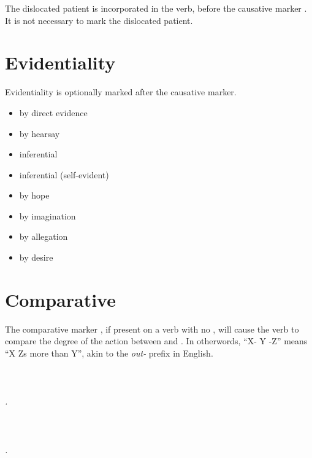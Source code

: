 \documentclass{book}
\begin{document}
The dislocated patient is incorporated in the verb, before the causative marker . It is not necessary to mark the dislocated patient.

\section{Evidentiality}

Evidentiality is optionally marked after the causative marker.

\begin{itemize}
    \item {} by direct evidence
    \item {} by hearsay
    \item {} inferential
    \item {} inferential (self-evident)
    \item {} by hope
    \item {} by imagination
    \item {} by allegation
    \item {} by desire
\end{itemize}

\section{Comparative}

\label{sec:comparative}

The comparative marker , if present on a verb with no , will cause the verb to compare the degree of the action between  and . In otherwords, ``X- Y -Z'' means ``X Zs more than Y'', akin to the \emph{out-} prefix in English. \\
~\\
  \\
  \\
\emph{ .} \\
~\\
   \\
   \\
\emph{   .}
\end{document}
